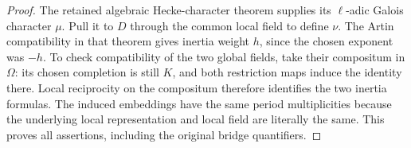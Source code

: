 \documentclass[11pt,a4paper]{article}
\numberwithin{equation}{section}
\theoremstyle{remark}\newtheorem{remark}[theorem]{Remark}
\begin{document}
\begin{proof}
The retained algebraic Hecke-character theorem supplies its
\(\ell\)-adic Galois character \(\mu\).  Pull it to \(D\)
through the common local field to define \(\nu\).  The Artin
compatibility in that theorem gives inertia weight \(h\), since
the chosen exponent was \(-h\).  To check compatibility of the
two global fields, take their compositum in \(\Omega\): its
chosen completion is still \(K\), and both restriction maps
induce the identity there.  Local reciprocity on the compositum
therefore identifies the two inertia formulas.  The induced
embeddings have the same period multiplicities because the
underlying local representation and local field are literally the
same.  This proves all assertions, including the original bridge
quantifiers.
\end{proof}

\end{document}
